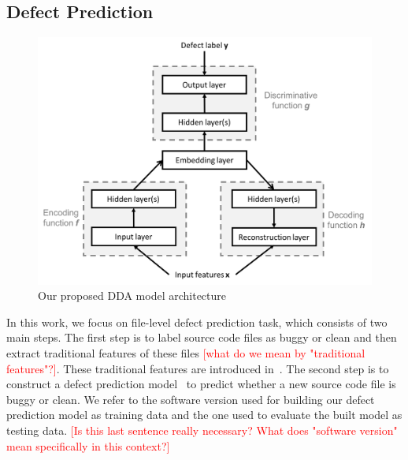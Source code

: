 \subsection{Defect Prediction}
\label{sec:defect_prediction}


\begin{figure}
	\centering
	\includegraphics[width=1.0\columnwidth]{dda_framework.png}
	\caption{Our proposed DDA model architecture}
	\label{fig:semi_framework}
\end{figure}



In this work, we focus on file-level defect prediction task, which consists of two main steps. The first step is to label source code files as buggy or clean and then extract traditional features of these files \textcolor{red}{[what do we mean by "traditional features"?]}. These traditional features are introduced in~\cite{wang2016automatically, mccabe1976complexity, chakradeo2013mast}. The second step is to construct a defect prediction model~\cite{bishop2006pattern} to predict whether a new source code file is buggy or clean.  We refer to the software version used for building our defect prediction model as training data and the one used to evaluate the built model as testing data. \textcolor{red}{[Is this last sentence really necessary? What does "software version" mean specifically in this context?]}

